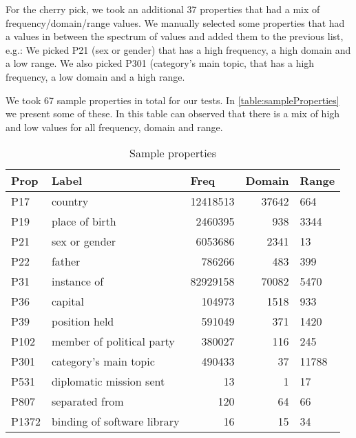For the cherry pick, we took an additional 37 properties that had a mix of frequency/domain/range values. We manually selected some properties that had a values in between the spectrum of values and added them to the previous list, e.g.: We picked P21 (sex or gender) that has a high frequency, a high domain and a low range. We also picked P301 (category's main topic, that has a high frequency, a low domain and a high range.

We took 67 sample properties in total for our tests. In \autoref{table:sampleProperties} we present some of these. In this table can observed that there is a mix of high and low values for all frequency, domain and range.

\begin{table}[]
\centering
\begin{tabular}{lrrrl}
\hline
 
\multicolumn{1}{l}{\textbf{Prop}} & \multicolumn{1}{l}{\textbf{Label}}            & \multicolumn{1}{l}{\textbf{Freq}} & \multicolumn{1}{l}{\textbf{Domain}} & \textbf{Range} \\ 
\hline
P17     & \multicolumn{1}{l}{country}                     & 12418513  & 37642  & 664     \\
P19     & \multicolumn{1}{l}{place of birth}              & 2460395   & 938    & 3344    \\
P21     & \multicolumn{1}{l}{sex or gender}               & 6053686   & 2341   & 13      \\
P22     & \multicolumn{1}{l}{father}                      & 786266    & 483    & 399     \\
P31     & \multicolumn{1}{l}{instance of}                 & 82929158  & 70082  & 5470    \\
P36     & \multicolumn{1}{l}{capital}                     & 104973    & 1518   & 933     \\
P39     & \multicolumn{1}{l}{position held}               & 591049    & 371    & 1420    \\
P102    & \multicolumn{1}{l}{member of political party}   & 380027    & 116    & 245     \\
P301    & \multicolumn{1}{l}{category's main topic}       & 490433    & 37     & 11788   \\
P531    & \multicolumn{1}{l}{diplomatic mission sent}     & 13        & 1      & 17      \\
P807    & \multicolumn{1}{l}{separated from}              & 120       & 64     & 66      \\
P1372   & \multicolumn{1}{l}{binding of software library} & 16        & 15     & 34      \\
\end{tabular}
\caption{Sample properties}
\label{table:sampleProperties}
\end{table}

